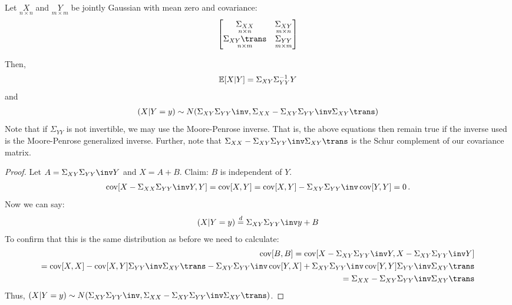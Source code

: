 \documentclass[../../../Master/AppliedStochastics.tex]{subfiles}
\begin{document}
\begin{lemma}
Let $\underset{n\times n}{X}$ and $\underset{m\times m}{Y}$ be
    jointly Gaussian with mean zero and covariance: 
$$\begin{aligned}
\begin{bmatrix}
  	\underset{n\times n}{\Sigma_{XX}} & \underset{m\times n}{\Sigma_{XY}} \\ 
   	\underset{n\times m}{\Sigma_{XY}\trans} & \underset{m\times m}{\Sigma_{YY}}
\end{bmatrix}
\end{aligned}$$

\begin{note} 
\end{note} 

Then, 
$$\begin{aligned}
\mathbb{E}[X\vert Y] = \Sigma_{XY}\Sigma_{YY}^{-1} Y
\end{aligned}$$
and 
$$\begin{aligned}
    (X\vert Y=y) \sim N(\Sigma_{XY}\Sigma_{YY}\inv, 
    \Sigma_{XX} - \Sigma_{XY} \Sigma_{YY}\inv \Sigma_{XY}\trans)
\end{aligned}$$
Note that if $\Sigma_{YY}$ is not invertible,
    we may use the Moore-Penrose inverse.
That is, the above equations then remain true if the inverse used
        is the Moore-Penrose generalized inverse.
Further,
    note that $\Sigma_{XX} - \Sigma_{XY} \Sigma_{YY}\inv \Sigma_{XY}\trans$
    is the Schur complement of our covariance matrix.
\end{lemma}



\begin{proof}
Let $A = \Sigma_{XY} \Sigma_{YY}\inv Y$ and $X = A + B$. 
Claim: $B$ is independent of $Y$.
$$\begin{aligned}
\cov[X - \Sigma_{XX} \Sigma_{YY}\inv Y, Y]
    = \cov[X, Y]
    = \cov[X, Y] - \Sigma_{XY} \Sigma_{YY}\inv \cov[Y, Y]  
 = 0\,.
\end{aligned}$$
Now we can say: 
$$\begin{aligned}
(X \vert Y = y) \stackrel{d}{=} \Sigma_{XY}\Sigma_{YY}\inv y + B 
\end{aligned}$$
To confirm that this is the same distribution as before
    we need to calculate: 
$$\begin{aligned}
    \cov[B, B] = \cov[X - \Sigma_{XY} \Sigma_{YY}\inv Y,
        X - \Sigma_{XY} \Sigma_{YY}\inv Y]\\
        = \cov[X, X] - \cov[X, Y] \Sigma_{YY}\inv \Sigma_{XY}\trans
            - \Sigma_{XY} \Sigma_{YY}\inv \cov[Y, X]
            + \Sigma_{XY} \Sigma_{YY}\inv \cov[Y, Y]
                \Sigma_{YY}\inv \Sigma_{XY}\trans \\
        = \Sigma_{XX} - \Sigma_{XY} \Sigma_{YY}\inv \Sigma_{XY}\trans
\end{aligned}$$
Thus,
    $(X \vert Y = y) \sim N(\Sigma_{XY}\Sigma_{YY}\inv,
        \Sigma_{XX} - \Sigma_{XY} \Sigma_{YY}\inv \Sigma_{XY}\trans)$.
\end{proof}
\end{document}
